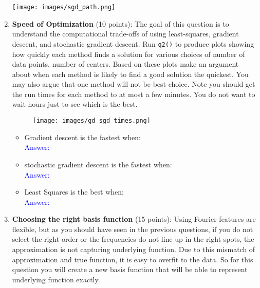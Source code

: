 \documentclass{article}
\begin{document}
\begin{enumerate}
    
    \begin{center}
        \texttt{[image: images/sgd\_path.png]}
    \end{center}

    \newpage
    \item \textbf{Speed of Optimization} (10 points): The goal of this question is to understand the computational trade-offs of using least-squares, gradient descent, and stochastic gradient descent. Run \texttt{q2()} to produce plots showing how quickly each method finds a solution for various choices of number of data points, number of centers. Based on these plots make an argument about when each method is likely to find a good solution the quickest. You may also argue that one method will not be best choice. Note you should get the run times for each method to at most a few minutes. You do not want to wait hours just to see which is the best.

    \begin{figure}
        \centering
        \texttt{[image: images/gd\_sgd\_times.png]}
    \end{figure}
    
    \begin{itemize}
    \item Gradient descent is the fastest when: \\
    \textcolor{blue}{Answer: \\
    }

    \item stochastic gradient descent is the fastest when: \\
    \textcolor{blue}{Answer: \\
    }

    \item Least Squares is the best when: \\
    \textcolor{blue}{Answer: \\
    }
    \end{itemize}
    
    \newpage
    \item \textbf{Choosing the right basis function} (15 points): Using Fourier features are flexible, but as you should have seen in the previous questions, if you do not select the right order or the frequencies do not line up in the right spots, the approximation is not capturing underlying function. Due to this mismatch of approximation and true function, it is easy to overfit to the data. So for this question you will create a new basis function that will be able to represent underlying function exactly.


\end{enumerate}
\end{document}
